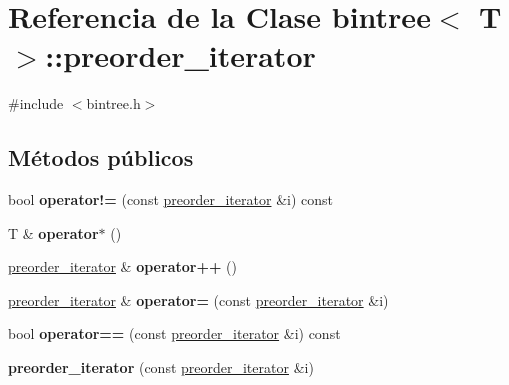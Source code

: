 \hypertarget{classbintree_1_1preorder__iterator}{}\section{Referencia de la Clase bintree$<$ T $>$\+:\+:preorder\+\_\+iterator}
\label{classbintree_1_1preorder__iterator}


{\ttfamily \#include $<$bintree.\+h$>$}

\subsection*{Métodos públicos}
\begin{DoxyCompactItemize}
\item 
\hypertarget{classbintree_1_1preorder__iterator_a0c270fba05a0d6357580ac22bd09de19}{}bool {\bfseries operator!=} (const \hyperlink{classbintree_1_1preorder__iterator}{preorder\+\_\+iterator} \&i) const \label{classbintree_1_1preorder__iterator_a0c270fba05a0d6357580ac22bd09de19}

\item 
\hypertarget{classbintree_1_1preorder__iterator_ae74ae100f2d01a6b7bcad308901daa58}{}T \& {\bfseries operator$\ast$} ()\label{classbintree_1_1preorder__iterator_ae74ae100f2d01a6b7bcad308901daa58}

\item 
\hypertarget{classbintree_1_1preorder__iterator_a13bf7273ea805ab74b49bcc954e2a1ea}{}\hyperlink{classbintree_1_1preorder__iterator}{preorder\+\_\+iterator} \& {\bfseries operator++} ()\label{classbintree_1_1preorder__iterator_a13bf7273ea805ab74b49bcc954e2a1ea}

\item 
\hypertarget{classbintree_1_1preorder__iterator_abd22c87f35d056ca06c0ad1d1e7aa3e8}{}\hyperlink{classbintree_1_1preorder__iterator}{preorder\+\_\+iterator} \& {\bfseries operator=} (const \hyperlink{classbintree_1_1preorder__iterator}{preorder\+\_\+iterator} \&i)\label{classbintree_1_1preorder__iterator_abd22c87f35d056ca06c0ad1d1e7aa3e8}

\item 
\hypertarget{classbintree_1_1preorder__iterator_af89d8bdcfc4e370b6e01ac6a895b2c1c}{}bool {\bfseries operator==} (const \hyperlink{classbintree_1_1preorder__iterator}{preorder\+\_\+iterator} \&i) const \label{classbintree_1_1preorder__iterator_af89d8bdcfc4e370b6e01ac6a895b2c1c}

\item 
\hypertarget{classbintree_1_1preorder__iterator_a68efecc720b7eeed8824f4070afaa56e}{}{\bfseries preorder\+\_\+iterator} (const \hyperlink{classbintree_1_1preorder__iterator}{preorder\+\_\+iterator} \&i)\label{classbintree_1_1preorder__iterator_a68efecc720b7eeed8824f4070afaa56e}

\end{DoxyCompactItemize}

